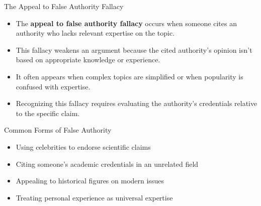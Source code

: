 \documentclass{beamer}
\begin{document}
\begin{frame}{The Appeal to False Authority Fallacy}
    \begin{itemize}
        \item The \textbf{appeal to false authority fallacy} occurs when someone cites an authority who lacks relevant expertise on the topic.
        \item This fallacy weakens an argument because the cited authority's opinion isn't based on appropriate knowledge or experience.
        \item It often appears when complex topics are simplified or when popularity is confused with expertise.
        \item Recognizing this fallacy requires evaluating the authority's credentials relative to the specific claim.
    \end{itemize}
    
    \begin{block}{Common Forms of False Authority}
        \begin{itemize}
            \item Using celebrities to endorse scientific claims
            \item Citing someone's academic credentials in an unrelated field
            \item Appealing to historical figures on modern issues
            \item Treating personal experience as universal expertise
        \end{itemize}
    \end{block}
\end{frame}
\end{document}
